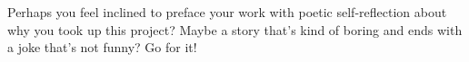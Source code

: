 
\begin{preface}

Perhaps you feel inclined to preface your work with poetic 
self-reflection about why you took up this project? Maybe a story 
that's kind of boring and ends with a joke that's not funny? Go for it!


\end{preface}

